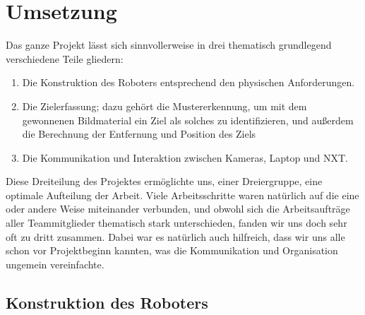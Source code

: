 \documentclass[12pt,a4paper]{article}
\begin{document}
\section{Umsetzung}

Das ganze Projekt lässt sich sinnvollerweise in drei thematisch grundlegend verschiedene Teile gliedern:
\begin{enumerate}
\item
Die Konstruktion des Roboters entsprechend den physischen Anforderungen.
\item
Die Zielerfassung; dazu gehört die Mustererkennung, um mit dem gewonnenen Bildmaterial ein Ziel als solches zu identifizieren, und außerdem die Berechnung der Entfernung und Position des Ziels
\item
Die Kommunikation und Interaktion zwischen Kameras, Laptop und NXT.
\end{enumerate}
Diese Dreiteilung des Projektes ermöglichte uns, einer Dreiergruppe, eine optimale Aufteilung der Arbeit. Viele Arbeitsschritte waren natürlich auf die eine oder andere Weise miteinander verbunden, und obwohl sich die Arbeitsaufträge aller Teammitglieder thematisch stark unterschieden, fanden wir uns doch sehr oft zu dritt zusammen. Dabei war es natürlich auch hilfreich, dass wir uns alle schon vor Projektbeginn kannten, was die Kommunikation und Organisation ungemein vereinfachte. 

\subsection{Konstruktion des Roboters}
\end{document}
